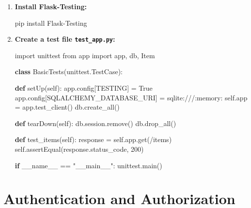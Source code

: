 \documentclass[
  letterpaper,
  DIV=11,
  numbers=noendperiod]{scrreprt}
\newenvironment{Shaded}{\begin{snugshade}}{\end{snugshade}}
\newcommand{\ControlFlowTok}[1]{\textcolor[rgb]{0.00,0.23,0.31}{\textbf{#1}}}
\newcommand{\DecValTok}[1]{\textcolor[rgb]{0.68,0.00,0.00}{#1}}
\newcommand{\ExtensionTok}[1]{\textcolor[rgb]{0.00,0.23,0.31}{#1}}
\newcommand{\ImportTok}[1]{\textcolor[rgb]{0.00,0.46,0.62}{#1}}
\newcommand{\KeywordTok}[1]{\textcolor[rgb]{0.00,0.23,0.31}{\textbf{#1}}}
\newcommand{\NormalTok}[1]{\textcolor[rgb]{0.00,0.23,0.31}{#1}}
\newcommand{\OperatorTok}[1]{\textcolor[rgb]{0.37,0.37,0.37}{#1}}
\newcommand{\StringTok}[1]{\textcolor[rgb]{0.13,0.47,0.30}{#1}}
\newcommand{\VariableTok}[1]{\textcolor[rgb]{0.07,0.07,0.07}{#1}}
\begin{document}
\begin{enumerate}
\def\labelenumi{\arabic{enumi}.}
\item
  \textbf{Install Flask-Testing:}

\begin{Shaded}
\begin{Highlighting}[]
\ExtensionTok{pip}\NormalTok{ install Flask{-}Testing}
\end{Highlighting}
\end{Shaded}
\item
  \textbf{Create a test file \texttt{test\_app.py}:}

\begin{Shaded}
\begin{Highlighting}[]
\ImportTok{import}\NormalTok{ unittest}
\ImportTok{from}\NormalTok{ app }\ImportTok{import}\NormalTok{ app, db, Item}

\KeywordTok{class}\NormalTok{ BasicTests(unittest.TestCase):}

    \KeywordTok{def}\NormalTok{ setUp(}\VariableTok{self}\NormalTok{):}
\NormalTok{        app.config[}\StringTok{\textquotesingle{}TESTING\textquotesingle{}}\NormalTok{] }\OperatorTok{=} \VariableTok{True}
\NormalTok{        app.config[}\StringTok{\textquotesingle{}SQLALCHEMY\_DATABASE\_URI\textquotesingle{}}\NormalTok{] }\OperatorTok{=} \StringTok{\textquotesingle{}sqlite:///:memory:\textquotesingle{}}
        \VariableTok{self}\NormalTok{.app }\OperatorTok{=}\NormalTok{ app.test\_client()}
\NormalTok{        db.create\_all()}

    \KeywordTok{def}\NormalTok{ tearDown(}\VariableTok{self}\NormalTok{):}
\NormalTok{        db.session.remove()}
\NormalTok{        db.drop\_all()}

    \KeywordTok{def}\NormalTok{ test\_items(}\VariableTok{self}\NormalTok{):}
\NormalTok{        response }\OperatorTok{=} \VariableTok{self}\NormalTok{.app.get(}\StringTok{\textquotesingle{}/items\textquotesingle{}}\NormalTok{)}
        \VariableTok{self}\NormalTok{.assertEqual(response.status\_code, }\DecValTok{200}\NormalTok{)}

\ControlFlowTok{if} \VariableTok{\_\_name\_\_} \OperatorTok{==} \StringTok{"\_\_main\_\_"}\NormalTok{:}
\NormalTok{    unittest.main()}
\end{Highlighting}
\end{Shaded}
\end{enumerate}

\section{Authentication and
Authorization}\label{authentication-and-authorization}
\end{document}
